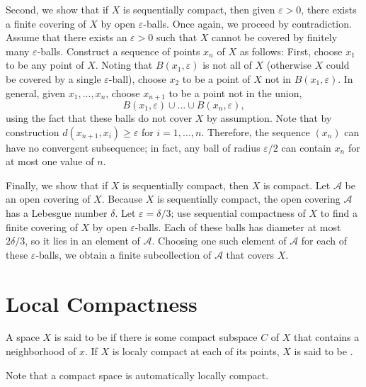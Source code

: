 \documentclass[12pt, a4paper, twoside, openright, titlepage]{book}
\begin{document}
\begin{proof*}{}{}
    Second, we show that if $X$ is sequentially compact, then given $\varepsilon > 0$, there exists a finite covering of $X$ by open $\varepsilon$-balls. Once again, we proceed by contradiction. Assume that there exists an $\varepsilon > 0$ such that $X$ cannot be covered by finitely many $\varepsilon$-balls. Construct a sequence of points $x_n$ of $X$ as follows: First, choose $x_1$ to be any point of $X$. Noting that $B(x_1,\varepsilon)$ is not all of $X$ (otherwise $X$ could be covered by a single $\varepsilon$-ball), choose $x_2$ to be a point of $X$ not in $B(x_1,\varepsilon)$. In general, given $x_1,...,x_n$, choose $x_{n+1}$ to be a point not in the union, \begin{equation*}
        B(x_1,\varepsilon)\cup...\cup B(x_n,\varepsilon),
    \end{equation*}
    using the fact that these balls do not cover $X$ by assumption. Note that by construction $d(x_{n+1},x_i) \geq \varepsilon$ for $i = 1,...,n$. Therefore, the sequence $(x_n)$ can have no convergent subsequence; in fact, any ball of radius $\varepsilon/2$ can contain $x_n$ for at most one value of $n$.

    Finally, we show that if $X$ is sequentially compact, then $X$ is compact. Let $\mathcal{A}$ be an open covering of $X$. Because $X$ is sequentially compact, the open covering $\mathcal{A}$ has a Lebesgue number $\delta$. Let $\varepsilon = \delta/3$; use sequential compactness of $X$ to find a finite covering of $X$ by open $\varepsilon$-balls. Each of these balls has diameter at most $2\delta/3$, so it lies in an element of $\mathcal{A}$. Choosing one such element of $\mathcal{A}$ for each of these $\varepsilon$-balls, we obtain a finite subcollection of $\mathcal{A}$ that covers $X$.
\end{proof*}


\section{Local Compactness}

\begin{defn}{}{}
    A space $X$ is said to be  if there is some compact subspace $C$ of $X$ that contains a neighborhood of $x$. If $X$ is localy compact at each of its points, $X$ is said to be .
\end{defn}

Note that a compact space is automatically locally compact.
\end{document}
